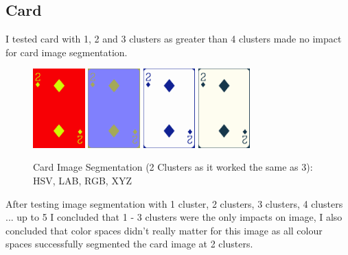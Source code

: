 \documentclass[conference]{IEEEtran}
\begin{document}
\subsection{Card}
I tested card with 1, 2 and 3 clusters as greater than 4 clusters made no impact for card image segmentation.
\begin{figure}[H]
    \centerline{
        {\includegraphics[width=20mm, scale=0.5]{./figures/task 4/card/2 clusters HSV.png}}
        {\includegraphics[width=20mm, scale=0.5]{./figures/task 4/card/2 clusters LAB.png}}
        {\includegraphics[width=20mm, scale=0.5]{./figures/task 4/card/2 clusters RGB.png}}
        {\includegraphics[width=20mm, scale=0.5]{./figures/task 4/card/2 clusters XYZ.png}}
    }
    \caption{Card Image Segmentation (2 Clusters as it worked the same as 3): HSV, LAB, RGB, XYZ}
    \label{fig}
\end{figure}
After testing image segmentation with 1 cluster, 2 clusters, 3 clusters, 4 clusters ... up to 5 I concluded that 1 - 3 clusters were
the only impacts on image, I also concluded that color spaces didn't really matter for this image as all colour spaces successfully
segmented the card image at 2 clusters.
\end{document}
